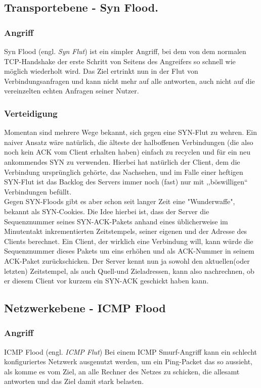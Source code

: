 \documentclass[12pt,a4paper]{article}
\begin{document}
\subsection{Transportebene - Syn Flood.}
\subsubsection*{Angriff}
Syn Flood (engl. \textit{Syn Flut}) ist ein simpler Angriff, bei dem von dem normalen TCP-Handshake der erste Schritt von Seitens des Angreifers so schnell wie möglich wiederholt wird. Das Ziel ertrinkt nun in der Flut von Verbindungsanfragen und kann nicht mehr auf alle antworten, auch nicht auf die vereinzelten echten Anfragen seiner Nutzer.
\subsubsection*{Verteidigung}
Momentan sind mehrere Wege bekannt, sich gegen eine SYN-Flut zu wehren. Ein naiver Ansatz wäre natürlich, die älteste der halboffenen Verbindungen (die also noch kein ACK vom Client erhalten haben) einfach zu recyclen und für ein neu ankommendes SYN zu verwenden. Hierbei hat natürlich der Client, dem die Verbindung ursprünglich gehörte, das Nachsehen, und im Falle einer heftigen SYN-Flut ist das Backlog des Servers immer noch (fast) nur mit ,,böswilligen`` Verbindungen befüllt.\\
Gegen SYN-Floods gibt es aber schon seit langer Zeit eine "Wunderwaffe", bekannt als SYN-Cookies. Die Idee hierbei ist, dass der Server die Sequenznummer seines SYN-ACK-Pakets anhand eines üblicherweise im Minutentakt inkrementierten Zeitstempels, seiner eigenen und der Adresse des Clients berechnet. Ein Client, der wirklich eine Verbindung will, kann würde die Sequenznummer dieses Pakets um eins erhöhen und als ACK-Nummer in seinem ACK-Paket zurückschicken. Der Server kennt nun ja sowohl den aktuellen(oder letzten) Zeitstempel, als auch Quell-und Zieladressen, kann also nachrechnen, ob er diesem Client vor kurzem ein SYN-ACK geschickt haben kann.
\subsection{Netzwerkebene - ICMP Flood}
\subsubsection*{Angriff}
ICMP Flood (engl. \textit{ICMP Flut}) Bei einem ICMP Smurf-Angriff kann ein schlecht konfiguriertes Netzwerk ausgenutzt werden, um ein Ping-Packet das so aussieht, als komme es vom Ziel, an alle Rechner des Netzes zu schicken, die allesamt antworten und das Ziel damit stark belasten.
\end{document}
